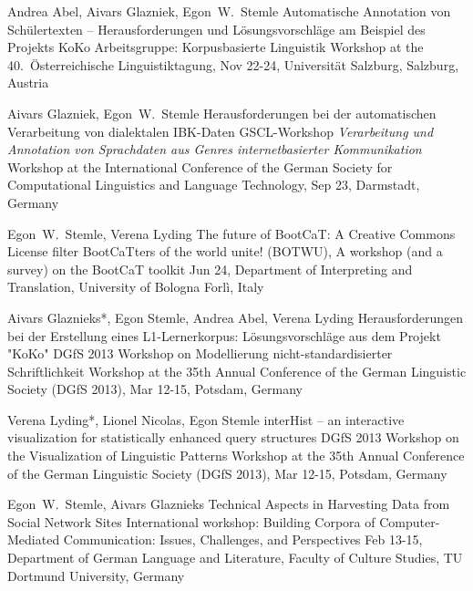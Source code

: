 \documentclass[10pt,a4paper,sans]{moderncv}
\begin{document}
        {Andrea Abel, Aivars Glazniek, Egon~W.~Stemle}
        {Automatische Annotation von Schülertexten -- Herausforderungen
        und Lösungsvorschläge am Beispiel des Projekts KoKo}
        {Arbeitsgruppe: Korpusbasierte Linguistik} 
        {Workshop at the 40.~Österreichische Linguistiktagung, Nov
        22-24, Universität Salzburg, Salzburg, Austria}
        {}


        {Aivars Glazniek, Egon~W.~Stemle}
        {Herausforderungen bei der automatischen Verarbeitung von dialektalen IBK-Daten}
        {GSCL-Workshop \emph{Verarbeitung und Annotation von Sprachdaten aus
        Genres internetbasierter Kommunikation}}
        {Workshop at the International Conference of the German Society
        for Computational Linguistics and Language Technology, Sep 23,
        Darmstadt, Germany}
        {}

        {Egon~W.~Stemle, Verena Lyding}
        {The future of BootCaT: A Creative Commons License filter}
        {BootCaTters of the world unite! (BOTWU), A workshop (and a
        survey) on the BootCaT toolkit}
        {Jun 24, Department of Interpreting and Translation, University
        of Bologna Forl\`{i}, Italy}
        {}


        {Aivars Glaznieks*, Egon Stemle, Andrea Abel, Verena Lyding}
        {Herausforderungen bei der Erstellung eines L1-Lernerkorpus:
        Lösungsvorschläge aus dem Projekt "KoKo"}
        {DGfS 2013 Workshop on Modellierung nicht-standardisierter
        Schriftlichkeit}
        {Workshop at the 35th Annual Conference of the German Linguistic
        Society (DGfS 2013), Mar 12-15, Potsdam, Germany}
        {}

        {Verena Lyding*, Lionel Nicolas, Egon Stemle}
        {interHist -- an interactive visualization for statistically
        enhanced query structures}
        {DGfS 2013 Workshop on the Visualization of Linguistic Patterns}
        {Workshop at the 35th Annual Conference of the German Linguistic
        Society (DGfS 2013), Mar 12-15, Potsdam, Germany}
        {}

        {Egon~W.~Stemle, Aivars Glaznieks}
        {Technical Aspects in Harvesting Data from Social Network Sites}
        {International workshop: Building Corpora of Computer-Mediated
        Communication: Issues, Challenges, and Perspectives}
        {Feb 13-15, Department of German Language and Literature, Faculty of
        Culture Studies, TU Dortmund University, Germany}
        {}
\end{document}
